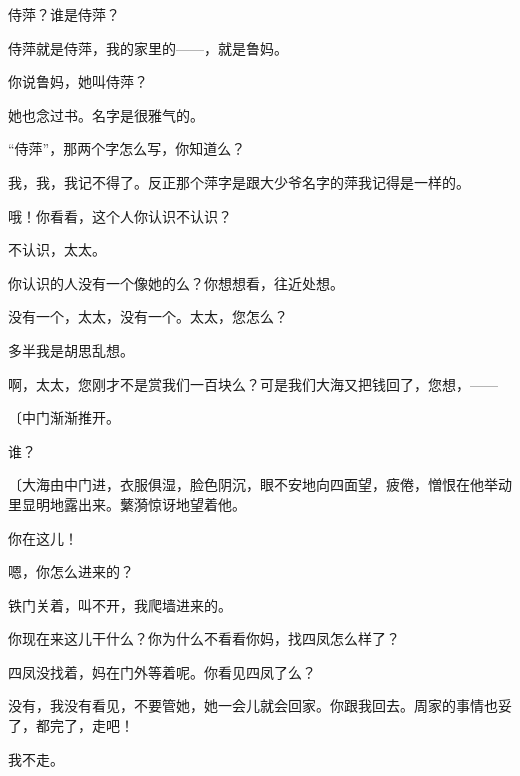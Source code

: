 侍萍？谁是侍萍？

侍萍就是侍萍，我的家里的——，就是鲁妈。

你说鲁妈，她叫侍萍？

她也念过书。名字是很雅气的。

“侍萍”，那两个字怎么写，你知道么？

我，我，我记不得了。反正那个萍字是跟大少爷名字的萍我记得是一样的。

哦！你看看，这个人你认识不认识？

不认识，太太。

你认识的人没有一个像她的么？你想想看，往近处想。

没有一个，太太，没有一个。太太，您怎么？

多半我是胡思乱想。

啊，太太，您刚才不是赏我们一百块么？可是我们大海又把钱回了，您想，——

{\fangsong〔中门渐渐推开。}

谁？

{\fangsong〔大海由中门进，衣服俱湿，脸色阴沉，眼不安地向四面望，疲倦，憎恨在他举动里显明地露出来。蘩漪惊讶地望着他。}

你在这儿！

嗯，你怎么进来的？

铁门关着，叫不开，我爬墙进来的。

你现在来这儿干什么？你为什么不看看你妈，找四凤怎么样了？

四凤没找着，妈在门外等着呢。你看见四凤了么？

没有，我没有看见，不要管她，她一会儿就会回家。你跟我回去。周家的事情也妥了，都完了，走吧！

我不走。

